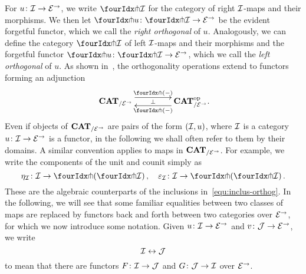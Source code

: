 \documentclass[reqno,10pt,a4paper,oneside,draft]{amsart}
\begin{document}
{{For $u \co \cal{I} \to \catE^\to$, we write $\liftr{\cal{I}}$ for the category of right $\cal{I}$-maps and their morphisms.
We then let $\liftr{u} \co \liftr{\cal{I}} \to \catE^\to$ be the evident forgetful functor, which we call the \emph{right orthogonal} of $u$. Analogously, we can define the category $\liftl{\cal{I}}$  of left $\cal{I}$-maps and their morphisms 
and the forgetful functor $\liftl{u} \co \liftl{\cal{I}} \to \cal{E}^\to$, which we call the \emph{left orthogonal} of $u$. 
As shown in~\cite[Proposition~3.8]{garner:small-object-argument}, the orthogonality operations
extend to functors forming an adjunction
\begin{equation} \label{garner-adjunction}
\begin{gathered}
\xymatrix@C+2em{
  \CAT_{/\catE^\to}
  \ar@<5pt>[r]^-{\liftl{\brarghole}}
  \ar@{}[r]|-{\bot}
&
  \CAT_{/\catE^\to}^{\op}
  \ar@<5pt>[l]^-{\liftr{\brarghole}}
\rlap{.}}
\end{gathered}
\end{equation}
Even if objects of $\CAT_{/\catE^\to}$ are pairs of the form $(\cal{I}, u)$, where $\cal{I}$ is a category $u \co
\cal{I} \to \catE^\to$ is a functor, in the following we shall often refer to them by their domains.
A similar convention applies to maps in $\CAT_{/\catE^\to}$.
For example, we write the components of the unit and counit simply as
\[
\eta_\cal{I} \co \cal{I} \to \liftl{(\liftr{\cal{I}})}
\, , \quad
\varepsilon_\cal{I} \co \cal{I} \to \liftr{(\liftl{\cal{I}})}
\, .\]
These are the algebraic counterparts of the inclusions in~\eqref{equ:inclus-orthog}.
In the following, we will see that some familiar equalities between two classes of maps are replaced by functors back and forth between two categories over $\cal{E}^\to$, for which we now introduce some notation.
Given $u \co \cal{I} \to \cal{E}^\to$ and $v \co \cal{J} \to \cal{E}^\to$, we write
\begin{equation} \label{equ:logical-equivalence}
\cal{I} \leftrightarrow \cal{J}
\end{equation}
to mean that there are functors $F \co \cal{I} \to \cal{J}$ and $G \co \cal{J} \to \cal{I}$ over $\cal{E}^\to$.

}}
\end{document}
